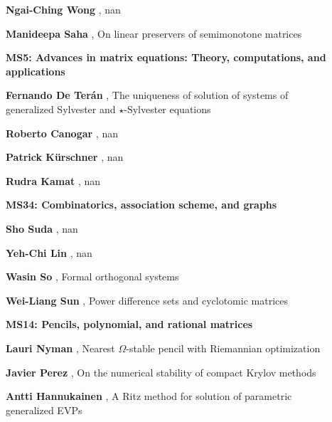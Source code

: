 \documentclass[ILAS2025-program.tex]{subfiles}
\begin{document}
\begin{description}
\begin{description}
        \item[] \textbf{Ngai-Ching Wong} , nan
        \item[] \textbf{Manideepa Saha} , On linear preservers of semimonotone matrices
        \end{description}
    \begin{description}
    \item[] {\color{mstitle}\textbf{MS5: Advances in matrix equations: Theory, computations, and applications}} 
    \item[] \textbf{Fernando De Terán} , The uniqueness of solution of systems of generalized Sylvester and $\star$-Sylvester equations
        \item[] \textbf{Roberto Canogar} , nan
        \item[] \textbf{Patrick Kürschner} , nan
        \item[] \textbf{Rudra Kamat} , nan
        \end{description}
    \begin{description}
    \item[] {\color{mstitle}\textbf{MS34: Combinatorics, association scheme, and graphs}} 
    \item[] \textbf{Sho Suda} , nan
        \item[] \textbf{Yeh-Chi Lin} , nan
        \item[] \textbf{Wasin So} , Formal orthogonal systems
        \item[] \textbf{Wei-Liang Sun} , Power difference sets and cyclotomic matrices
        \end{description}
    \begin{description}
    \item[] {\color{mstitle}\textbf{MS14: Pencils, polynomial, and rational matrices}} 
    \item[] \textbf{Lauri Nyman} , Nearest $\Omega$-stable pencil with Riemannian optimization
        \item[] \textbf{Javier Perez} , On the numerical stability of compact Krylov methods
        \item[] \textbf{Antti Hannukainen} , A Ritz method for solution of parametric generalized EVPs

\end{description}
\end{description}
\end{document}
